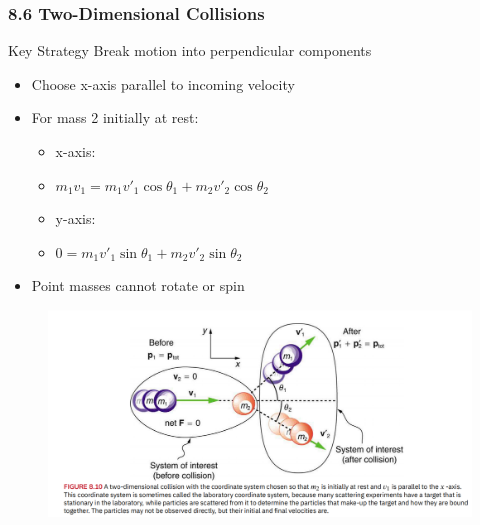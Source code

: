 \documentclass[aspectratio=169]{beamer}
\begin{document}
\begin{frame}
\frametitle{8.6 Two-Dimensional Collisions}

\begin{block}{Key Strategy}
Break motion into perpendicular components
\end{block}

\begin{itemize}
\item Choose x-axis parallel to incoming velocity
\item For mass 2 initially at rest:
    \begin{itemize}
    \item x-axis:
    \item $m_1v_1 = m_1v'_1\cos\theta_1 + m_2v'_2\cos\theta_2$
    \item y-axis:
    \item $0 = m_1v'_1\sin\theta_1 + m_2v'_2\sin\theta_2$
    \end{itemize}
\item Point masses cannot rotate or spin
\end{itemize}
\end{frame}
\begin{frame}{}
    \begin{figure}
        \centering
        \includegraphics[width=1\linewidth]{CH8/Screenshot 2024-12-17 070905.png}
       
    \end{figure}
\end{frame}
\end{document}
